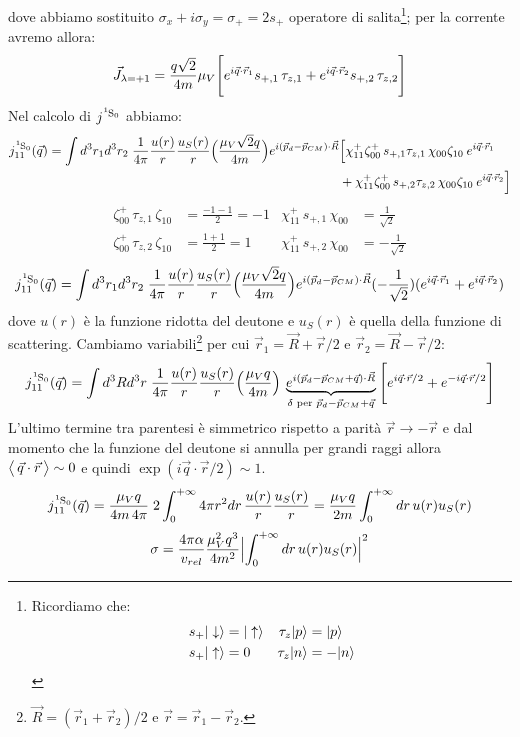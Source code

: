 dove abbiamo sostituito $\sigma_x + i \sigma_y = \sigma_+ = 2s_+$ operatore di salita\footnote{Ricordiamo che:%
\begin{displaymath}
\begin{aligned}
s_{+}|\downarrow\rangle &= |\uparrow\rangle & \tau_z |p\rangle &= |p\rangle \\
s_{+}|\uparrow\rangle &= 0 & \tau_z |n\rangle &= -|n\rangle
\end{aligned}
\end{displaymath}%
}; per la corrente avremo allora:
$$\vec{J}_{\lambda=+1} = \frac{q\sqrt{2}}{4m} \mu_V \Biggl [ e^{i\vec{q}\cdot\vec{r}_1}s_{+,1}\,\tau_{z,1} + e^{i\vec{q}\cdot\vec{r}_2}s_{+,2}\,\tau_{z,2} \Biggr ] $$
Nel calcolo di $j^{\ce{^1S_0}}$ abbiamo:
\begin{displaymath}
\begin{aligned}
j^{\ce{^1S_0}}_{11}(\vec{q}) = \int d^3r_1d^3r_2\; \frac{1}{4\pi}\frac{u(r)}{r}\frac{u_S(r)}{r}\ppc{\frac{\mu_V\sqrt{2}q}{4m}}e^{i(\vec{p}_d-\vec{p}_{CM})\cdot \vec{R}} &\Bigl [ \chi_{11}^+\zeta_{00}^+\, s_{+,1} \tau_{z,1}\, \chi_{00}\zeta_{10}\:e^{i\vec{q}\cdot\vec{r}_1} \\
&+ \chi_{11}^+\zeta_{00}^+\, s_{+,2} \tau_{z,2}\, \chi_{00}\zeta_{10}\:e^{i\vec{q}\cdot\vec{r}_2}\Bigr ]
\end{aligned}
\end{displaymath}
\begin{displaymath}
\begin{aligned}
\zeta_{00}^+\, \tau_{z,1}\, \zeta_{10} &= \frac{-1-1}{2} =-1  & \chi_{11}^+\, s_{+,1}\, \chi_{00} &= \frac{1}{\sqrt{2}} \\
\zeta_{00}^+\, \tau_{z,2}\, \zeta_{10} &= \frac{1+1}{2} = 1 & \chi_{11}^+\, s_{+,2}\, \chi_{00} &= -\frac{1}{\sqrt{2}} 
\end{aligned}
\end{displaymath}
$$j^{\ce{^1S_0}}_{11}(\vec{q}) = \int d^3r_1d^3r_2\; \frac{1}{4\pi}\frac{u(r)}{r}\frac{u_S(r)}{r}\ppc{\frac{\mu_V\sqrt{2}q}{4m}}e^{i(\vec{p}_d-\vec{p}_{CM})\cdot \vec{R}}(-\frac{1}{\sqrt{2}})(e^{i\vec{q}\cdot\vec{r}_1}+e^{i\vec{q}\cdot\vec{r}_2})$$
dove $u(r)$ è la funzione ridotta del deutone e $u_S(r)$ è quella della funzione di scattering. Cambiamo variabili\footnote{$\vec{R}=(\vec{r}_1+\vec{r}_2)/2$ e $\vec{r}=\vec{r}_1-\vec{r}_2$.} per cui $\vec{r}_1 = \vec{R}+\vec{r}/2$ e $\vec{r}_2 = \vec{R}-\vec{r}/2$:
$$j^{\ce{^1S_0}}_{11}(\vec{q}) = \int d^3Rd^3r\; \frac{1}{4\pi}\frac{u(r)}{r}\frac{u_S(r)}{r}\ppc{\frac{\mu_V q}{4m}}\: \underbrace{e^{i(\vec{p}_d-\vec{p}_{CM}+\vec{q})\cdot \vec{R}}}_{\delta \text{ per } \vec{p}_d-\vec{p}_{CM}+\vec{q}}\:
\PPq{e^{i\vec{q}\cdot\vec{r}/2}+e^{-i\vec{q}\cdot\vec{r}/2}}$$
L'ultimo termine tra parentesi è simmetrico rispetto a parità $\vec{r}\to -\vec{r}$ e dal momento che la funzione del deutone si annulla per grandi raggi allora $\bigl\langle\, \vec{q}\cdot\vec{r}\, \bigr\rangle\sim 0$ e quindi $\exp{(i\vec{q}\cdot\vec{r}/2)}\sim 1$.
$$j^{\ce{^1S_0}}_{11}(\vec{q}) = \frac{\mu_V q}{4m\,4\pi}\; 2\int_0^{+\infty} 4\pi r^2 dr \, \frac{u(r)}{r}\frac{u_S(r)}{r} = \frac{\mu_V q}{2m} \int_0^{+\infty} dr \, u(r) u_S(r)$$
$$\sigma = \frac{4\pi\alpha}{v_{rel}}\frac{\mu^2_V q^3}{4m^2} \Bigl |\int_0^{+\infty} dr \, u(r) u_S(r)\Bigr |^2$$


